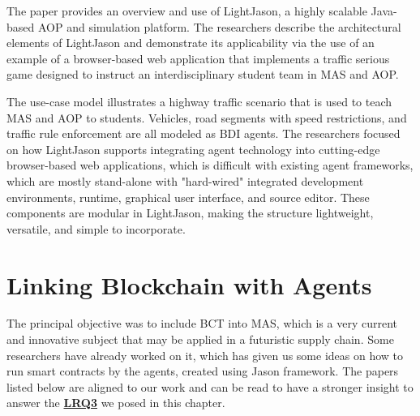 \begin{itemize}[label={}]
The paper \cite{lightjason} provides an overview and use of LightJason, a highly scalable Java-based \ac{AOP} and simulation platform. The researchers describe the architectural elements of LightJason and demonstrate its applicability via the use of an example of a browser-based web application that implements a traffic serious game designed to instruct an interdisciplinary student team in \ac{MAS} and \ac{AOP}.

\vspace{.5cm}

The use-case model illustrates a highway traffic scenario that is used to teach \ac{MAS} and \ac{AOP} to students. Vehicles, road segments with speed restrictions, and traffic rule enforcement are all modeled as \ac{BDI} agents. The researchers focused on how LightJason supports integrating agent technology into cutting-edge browser-based web applications, which is difficult with existing agent frameworks, which are mostly stand-alone with "hard-wired" integrated development environments, runtime, graphical user interface, and source editor. These components are modular in LightJason, making the structure lightweight, versatile, and simple to incorporate.

\end{itemize}


\section{Linking Blockchain with Agents}

The principal objective was to include \ac{BCT} into \ac{MAS}, which is a very current and innovative subject that may be applied in a futuristic supply chain. Some researchers have already worked on it, which has given us some ideas on how to run smart contracts by the agents, created using Jason framework. The papers listed below are aligned to our work and can be read to have a stronger insight to answer the \hyperref[LRQ3.]{\textbf{LRQ3}} we posed in this chapter.

